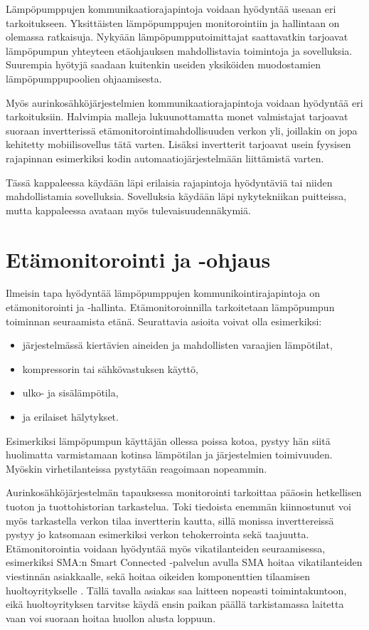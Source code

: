 Lämpöpumppujen kommunikaatiorajapintoja voidaan hyödyntää useaan eri tarkoitukseen. Yksittäisten lämpöpumppujen monitorointiin ja hallintaan on olemassa ratkaisuja. Nykyään lämpöpumpputoimittajat saattavatkin tarjoavat lämpöpumpun yhteyteen etäohjauksen mahdollistavia toimintoja ja sovelluksia. Suurempia hyötyjä saadaan kuitenkin useiden yksiköiden muodostamien lämpöpumppupoolien ohjaamisesta.

Myös aurinkosähköjärjestelmien kommunikaatiorajapintoja voidaan hyödyntää eri tarkoituksiin. Halvimpia malleja lukuunottamatta monet valmistajat tarjoavat suoraan invertterissä etämonitorointimahdollisuuden verkon yli, joillakin on jopa kehitetty mobiilisovellus tätä varten. Lisäksi invertterit tarjoavat usein fyysisen rajapinnan esimerkiksi kodin automaatiojärjestelmään liittämistä varten.

Tässä kappaleessa käydään läpi erilaisia rajapintoja hyödyntäviä tai niiden mahdollistamia sovelluksia. Sovelluksia käydään läpi nykytekniikan puitteissa, mutta kappaleessa avataan myös tulevaisuudennäkymiä.


\section{Etämonitorointi ja -ohjaus}

  Ilmeisin tapa hyödyntää lämpöpumppujen kommunikointirajapintoja on etämonitorointi ja -hallinta. Etämonitoroinnilla tarkoitetaan lämpöpumpun toiminnan seuraamista etänä. Seurattavia asioita voivat olla esimerkiksi:
  \begin{itemize}
    \item järjestelmässä kiertävien aineiden ja mahdollisten varaajien lämpötilat,
    \item kompressorin tai sähkövastuksen käyttö,
    \item ulko- ja sisälämpötila,
    \item ja erilaiset hälytykset.
  \end{itemize} \parencite{Latomaki}
  Esimerkiksi lämpöpumpun käyttäjän ollessa poissa kotoa, pystyy hän siitä huolimatta varmistamaan kotinsa lämpötilan ja järjestelmien toimivuuden. Myöskin virhetilanteissa pystytään reagoimaan nopeammin.

  Aurinkosähköjärjestelmän tapauksessa monitorointi tarkoittaa pääosin hetkellisen tuoton ja tuottohistorian tarkastelua. Toki tiedoista enemmän kiinnostunut voi myös tarkastella verkon tilaa invertterin kautta, sillä monissa inverttereissä pystyy jo katsomaan esimerkiksi verkon tehokerrointa sekä taajuutta. Etämonitorointia voidaan hyödyntää myös vikatilanteiden seuraamisessa, esimerkiksi SMA:n Smart Connected -palvelun avulla SMA hoitaa vikatilanteiden viestinnän asiakkaalle, sekä hoitaa oikeiden komponenttien tilaamisen huoltoyritykselle \parencite{SmartConnected}. Tällä tavalla asiakas saa laitteen nopeasti toimintakuntoon, eikä huoltoyrityksen tarvitse käydä ensin paikan päällä tarkistamassa laitetta vaan voi suoraan hoitaa huollon alusta loppuun.


